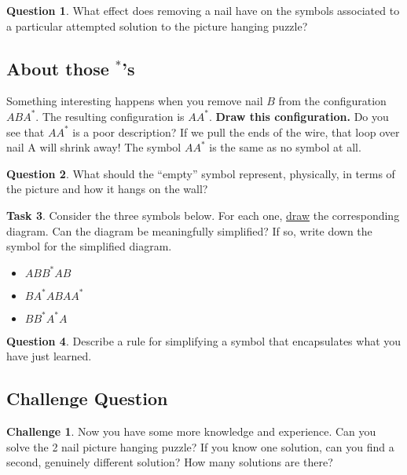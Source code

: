 \documentclass[12pt,letterpaper]{article}
\theoremstyle{definition}
\newtheorem{question}{Question}
\newtheorem*{challenge}{Challenge}
\newtheorem{task}[question]{Task}
\begin{document}
\begin{question}
What effect does removing a nail have on the symbols associated to a particular attempted solution to the picture hanging puzzle?
\end{question}

\subsection*{About those ${}^*$'s}

Something interesting happens when you remove nail $B$ from the configuration $ABA^*$.
The resulting configuration is $AA^*$.
\textbf{Draw this configuration.}
Do you see that $AA^*$ is a poor description?
If we pull the ends of the wire, that loop over nail A will shrink away!
The symbol $AA^*$ is the same as no symbol at all.
\begin{question}
What should the ``empty'' symbol represent, physically, in terms of the picture and how it hangs on the wall?
\end{question}

\begin{task}
Consider the three symbols below.
For each one, \underline{draw} the corresponding diagram.
Can the diagram be meaningfully simplified?
If so, write down the symbol for the simplified diagram.
\begin{itemize}
\item $ABB^*AB$
\item $BA^*ABAA^*$
\item $BB^*A^*A$
\end{itemize}
\end{task}

\begin{question}
Describe a rule for simplifying a symbol that encapsulates what you have just learned.
\end{question}

\subsection*{Challenge Question}

\begin{challenge}
Now you have some more knowledge and experience. Can you solve the 2 nail picture hanging puzzle? If you know one solution, can you find a second, genuinely different solution? How many solutions are there?
\end{challenge}


\end{document}

